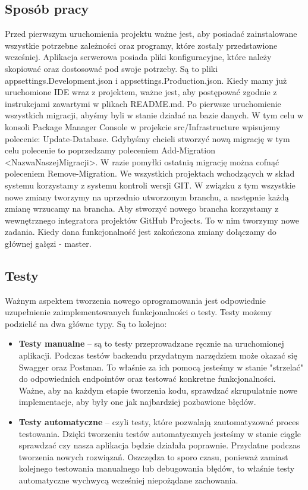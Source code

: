 \documentclass[a4paper,twoside,12pt]{book}
\begin{document}
\subsection{Sposób pracy}
Przed pierwszym uruchomienia projektu ważne jest, aby posiadać zainstalowane wszystkie potrzebne zależności oraz programy, które zostały przedstawione wcześniej. Aplikacja serwerowa posiada pliki konfiguracyjne, które należy skopiować oraz dostosować pod swoje potrzeby. Są to pliki appsettings.Development.json i appsettings.Production.json. Kiedy mamy już uruchomione IDE wraz z projektem, ważne jest, aby postępować zgodnie z instrukcjami zawartymi w plikach README.md. Po pierwsze uruchomienie wszystkich migracji, abyśmy byli w stanie działać na bazie danych. W tym celu w konsoli Package Manager Console w projekcie src/Infrastructure wpisujemy polecenie: Update-Database. Gdybyśmy chcieli stworzyć nową migrację w tym celu polecenie to poprzedzamy poleceniem Add-Migration <NazwaNaszejMigracji>. W razie pomyłki ostatnią migrację można cofnąć poleceniem Remove-Migration. We wszystkich projektach wchodzących w skład systemu korzystamy z systemu kontroli wersji GIT. W związku z tym wszystkie nowe zmiany tworzymy na uprzednio utworzonym branchu, a następnie każdą zmianę wrzucamy na brancha. Aby stworzyć nowego brancha korzystamy z wewnętrznego integratora projektów GitHub Projects. To w nim tworzymy nowe zadania. Kiedy dana funkcjonalność jest zakończona zmiany dołączamy do głównej gałęzi - master. 

\subsection{Testy}
Ważnym aspektem tworzenia nowego oprogramowania jest odpowiednie uzupełnienie zaimplementowanych funkcjonalności o testy. Testy możemy podzielić na dwa główne typy.
Są to kolejno:
\begin{itemize}
    \item \textbf{Testy manualne} -- są to testy przeprowadzane ręcznie na uruchomionej aplikacji. Podczas testów backendu przydatnym narzędziem może okazać się Swagger oraz Postman. To właśnie za ich pomocą jesteśmy w stanie "strzelać" do odpowiednich endpointów oraz testować konkretne funkcjonalności. Ważne, aby na każdym etapie tworzenia kodu, sprawdzać skrupulatnie nowe implementacje, aby były one jak najbardziej pozbawione błędów.
    \item \textbf{Testy automatyczne} -- czyli testy, które pozwalają zautomatyzować proces testowania. Dzięki tworzeniu testów automatycznych jesteśmy w stanie ciągle sprawdzać czy nasza aplikacja będzie działała poprawnie. Przydatne podczas tworzenia nowych rozwiązań. Oszczędza to sporo czasu, ponieważ zamiast kolejnego testowania manualnego lub debugowania błędów, to właśnie testy automatyczne wychwycą wcześniej niepożądane zachowania.
\end{itemize}
\end{document}
